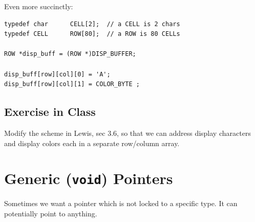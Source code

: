 
Even more succinctly:
\begin{verbatim}
typedef char      CELL[2];  // a CELL is 2 chars
typedef CELL      ROW[80];  // a ROW is 80 CELLs

ROW *disp_buff = (ROW *)DISP_BUFFER;

disp_buff[row][col][0] = 'A';
disp_buff[row][col][1] = COLOR_BYTE ;
\end{verbatim}



\subsection{Exercise in Class}


Modify the scheme in Lewis, sec 3.6, so that we
can address display characters and display colors
each in a separate row/column array.

\vspace{2.5in}	%
%
%
%
%
%
%
%
%


\section{Generic ({\tt void}) Pointers}

Sometimes we want a pointer which is not locked to a
specific type.  It can potentially point to anything.

